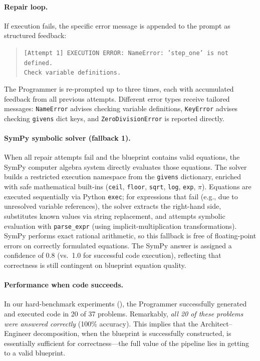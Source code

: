 \documentclass[11pt,a4paper]{article}
\begin{document}
\paragraph{Repair loop.}
If execution fails, the specific error message is appended to the prompt as structured feedback:
\begin{quote}
\small\texttt{[Attempt 1] EXECUTION ERROR: NameError: 'step\_one' is not defined.\\
Check variable definitions.}
\end{quote}
The Programmer is re-prompted up to three times, each with accumulated feedback from all previous attempts.
Different error types receive tailored messages: \texttt{NameError} advises checking variable definitions, \texttt{KeyError} advises checking \texttt{givens} dict keys, and \texttt{ZeroDivisionError} is reported directly.
\paragraph{SymPy symbolic solver (fallback 1).}
When all repair attempts fail and the blueprint contains valid equations, the SymPy computer algebra system directly evaluates those equations.
The solver builds a restricted execution namespace from the \texttt{givens} dictionary, enriched with safe mathematical built-ins (\texttt{ceil}, \texttt{floor}, \texttt{sqrt}, \texttt{log}, \texttt{exp}, $\pi$).
Equations are executed sequentially via Python \texttt{exec}; for expressions that fail (e.g., due to unresolved variable references), the solver extracts the right-hand side, substitutes known values via string replacement, and attempts symbolic evaluation with \texttt{parse\_expr} (using implicit-multiplication transformations).
SymPy performs exact rational arithmetic, so this fallback is free of floating-point errors on correctly formulated equations.
The SymPy answer is assigned a confidence of 0.8 (vs.\ 1.0 for successful code execution), reflecting that correctness is still contingent on blueprint equation quality.
\paragraph{Performance when code succeeds.}
In our hard-benchmark experiments (), the Programmer successfully generated and executed code in 20 of 37 problems.
Remarkably, \emph{all 20 of these problems were answered correctly} (100\% accuracy).
This implies that the Architect--Engineer decomposition, when the blueprint is successfully constructed, is essentially sufficient for correctness---the full value of the pipeline lies in getting to a valid blueprint.
\end{document}
